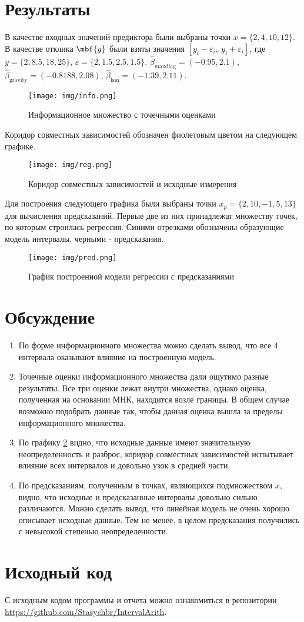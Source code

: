 \documentclass[a4paper]{article}
\begin{document}
\section{Результаты}
В качестве входных значений предиктора были выбраны точки $x=\{2,4,10,12\}$. В качестве отклика $\mbf{y}$ были взяты значения $[y_i-\varepsilon_i,\:y_i+\varepsilon_i]$, где $y=\{2,8.5,18,25\}$, $\varepsilon=\{2,1.5,2.5,1.5\}$. $\hat{\beta}_{\mathrm{max diag}}=(-0.95, 2.1)$, $\hat{\beta}_{\mathrm{gravity}}=(-0.8188, 2.08)$, $\hat{\beta}_{\mathrm{lsm}}=(-1.39, 2.11)$.
\begin{figure}[H]
    \centering
    \texttt{[image: img/info.png]}
    \caption{Информационное множество с точечными оценками}
    \label{fig:info}
\end{figure}
Коридор совместных зависимостей обозначен фиолетовым цветом на следующем графике.
\begin{figure}[H]
    \centering
    \texttt{[image: img/reg.png]}
    \caption{Коридор совместных зависимостей и исходные измерения}
    \label{fig:reg}
\end{figure}
Для построения следующего графика были выбраны точки $x_p=\{2,10,-1,5,13\}$ для вычисления предсказаний. Первые две из них принадлежат множеству точек, по которым строилась регрессия. Синими отрезками обозначены образующие модель интервалы, черными - предсказания.
\begin{figure}[H]
    \centering
    \texttt{[image: img/pred.png]}
    \caption{График построенной модели регрессии с предсказаниями}
    \label{fig:pred}
\end{figure}
\section{Обсуждение}
\begin{enumerate}
    \item По форме информационного множества можно сделать вывод, что все 4 интервала оказывают влияние на построенную модель.
    \item Точечные оценки информационного множества дали ощутимо разные результаты. Все три оценки лежат внутри множества, однако оценка, полученная на основании МНК, находится возле границы. В общем случае возможно подобрать данные так, чтобы данная оценка вышла за пределы информационного множества.
    \item По графику \ref{fig:reg} видно, что исходные данные имеют значительную неопределенность и разброс, коридор совместных зависимостей испытывает влияние всех интервалов и довольно узок в средней части.
    \item По предсказаниям, полученным в точках, являющихся подмножеством $x$, видно, что исходные и предсказанные интервалы довольно сильно различаются. Можно сделать вывод, что линейная модель не очень хорошо описывает исходные данные. Тем не менее, в целом предсказания получились с невысокой степенью неопределенности.
\end{enumerate}
\section*{Исходный код}
С исходным кодом программы и отчета можно ознакомиться в репозитории \url{https://github.com/Stasychbr/IntervalArith}.
\end{document}
